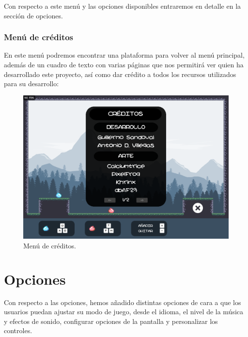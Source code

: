 \documentclass[12pt, spanish]{article}
\begin{document}
Con respecto a este menú y las opciones disponibles entraremos en detalle en la sección de opciones.

\newpage

\subsubsection{Menú de créditos}

En este menú podremos encontrar una plataforma para volver al menú principal, además de un cuadro de texto con varias páginas que nos permitirá ver quien ha desarrollado este proyecto, así como dar crédito a todos los recursos utilizados para su desarrollo:

\begin{figure}[H]
	\centering
	\includegraphics[width=\textwidth]{"interfaz/creditos.png"}
	\caption{Menú de créditos.}\label{figure:creditos}
\end{figure}

\newpage

\section{Opciones}

Con respecto a las opciones, hemos añadido distintas opciones de cara a que los usuarios puedan ajustar su modo de juego, desde el idioma, el nivel de la música y efectos de sonido, configurar opciones de la pantalla y personalizar los controles.
\end{document}
